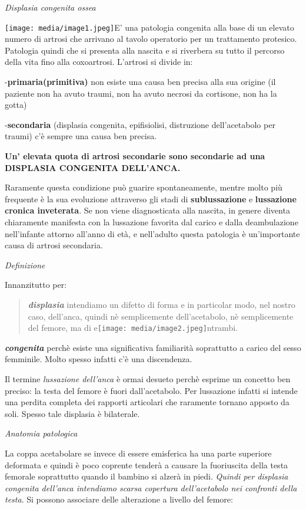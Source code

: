 \documentclass[]{article}
\date{}
\begin{document}
\emph{Displasia congenita ossea}

\texttt{[image: media/image1.jpeg]}E'
una patologia congenita alla base di un elevato numero di artrosi che
arrivano al tavolo operatorio per un trattamento protesico. Patologia
quindi che si presenta alla nascita e si riverbera su tutto il percorso
della vita fino alla coxoartrosi. L'artrosi si divide in:

-\textbf{primaria(primitiva)} non esiste una causa ben precisa alla sua
origine (il paziente non ha avuto traumi, non ha avuto necrosi da
cortisone, non ha la gotta)

-\textbf{secondaria} (displasia congenita, epifisiolisi, distruzione
dell'acetabolo per traumi) c'è sempre una causa ben precisa.

\textbf{Un' elevata quota di artrosi secondarie sono secondarie ad una
DISPLASIA CONGENITA DELL'ANCA.}

Raramente questa condizione può guarire spontaneamente, mentre molto più
frequente è la sua evoluzione attraverso gli stadi di
\textbf{sublussazione} e \textbf{lussazione cronica inveterata}. Se non
viene diagnosticata alla nascita, in genere diventa chiaramente
manifesta con la lussazione favorita dal carico e dalla deambulazione
nell'infante attorno all'anno di età, e nell'adulto questa patologia è
un'importante causa di artrosi secondaria.

\emph{Definizione}

Innanzitutto per:

\begin{quote}
\textbf{\emph{displasia}} intendiamo un difetto di forma e in particolar
modo, nel nostro caso, dell'anca, quindi nè semplicemente
dell'acetabolo, nè semplicemente del femore, ma di
e\texttt{[image: media/image2.jpeg]}ntrambi.
\end{quote}

\textbf{\emph{congenita}} perchè esiste una significativa familiarità
soprattutto a carico del sesso femminile. Molto spesso infatti c'è una
discendenza.

Il termine \emph{lussazione dell'anca} è ormai desueto perchè esprime un
concetto ben preciso: la testa del femore è fuori dall'acetabolo. Per
lussazione infatti si intende una perdita completa dei rapporti
articolari che raramente tornano apposto da soli. Spesso tale displasia
è bilaterale.

\emph{Anatomia patologica}

La coppa acetabolare se invece di essere emisferica ha una parte
superiore deformata e quindi è poco coprente tenderà a causare la
fuoriuscita della testa femorale soprattutto quando il bambino si alzerà
in piedi. \emph{Quindi per displasia congenita dell'anca intendiamo
scarsa copertura dell'acetabolo nei confronti della testa}. Si possono
associare delle alterazione a livello del femore:
\end{document}
